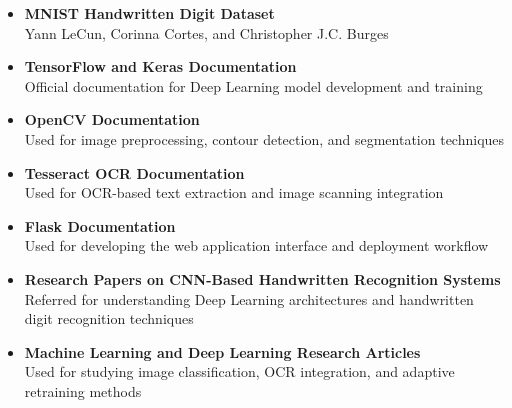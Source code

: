 \documentclass[12pt,a4paper]{article}
\begin{document}
\begin{itemize}

\item \textbf{MNIST Handwritten Digit Dataset} \\
Yann LeCun, Corinna Cortes, and Christopher J.C. Burges

\vspace{0.2cm}

\item \textbf{TensorFlow and Keras Documentation} \\
Official documentation for Deep Learning model development and training

\vspace{0.2cm}

\item \textbf{OpenCV Documentation} \\
Used for image preprocessing, contour detection, and segmentation techniques

\vspace{0.2cm}

\item \textbf{Tesseract OCR Documentation} \\
Used for OCR-based text extraction and image scanning integration

\vspace{0.2cm}

\item \textbf{Flask Documentation} \\
Used for developing the web application interface and deployment workflow

\vspace{0.2cm}

\item \textbf{Research Papers on CNN-Based Handwritten Recognition Systems} \\
Referred for understanding Deep Learning architectures and handwritten digit recognition techniques

\vspace{0.2cm}

\item \textbf{Machine Learning and Deep Learning Research Articles} \\
Used for studying image classification, OCR integration, and adaptive retraining methods

\end{itemize}

\vspace{0.3cm}
\end{document}
